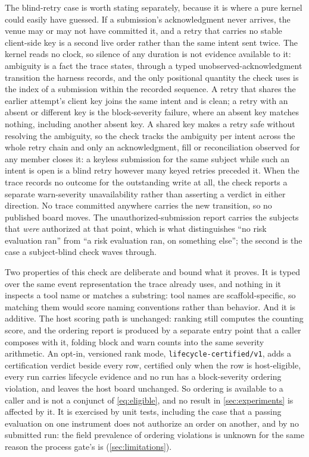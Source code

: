 The blind-retry case is worth stating separately, because it is where a pure kernel could easily have guessed. If a submission's acknowledgment never arrives, the venue may or may not have committed it, and a retry that carries no stable client-side key is a second live order rather than the same intent sent twice. The kernel reads no clock, so silence of any duration is not evidence available to it: ambiguity is a fact the trace states, through a typed unobserved-acknowledgment transition the harness records, and the only positional quantity the check uses is the index of a submission within the recorded sequence. A retry that shares the earlier attempt's client key joins the same intent and is clean; a retry with an absent or different key is the block-severity failure, where an absent key matches nothing, including another absent key. A shared key makes a retry safe without resolving the ambiguity, so the check tracks the ambiguity per intent across the whole retry chain and only an acknowledgment, fill or reconciliation observed for any member closes it: a keyless submission for the same subject while such an intent is open is a blind retry however many keyed retries preceded it. When the trace records no outcome for the outstanding write at all, the check reports a separate warn-severity unavailability rather than asserting a verdict in either direction. No trace committed anywhere carries the new transition, so no published board moves. The unauthorized-submission report carries the subjects that \emph{were} authorized at that point, which is what distinguishes ``no risk evaluation ran'' from ``a risk evaluation ran, on something else''; the second is the case a subject-blind check waves through.

Two properties of this check are deliberate and bound what it proves. It is typed over the same event representation the trace already uses, and nothing in it inspects a tool name or matches a substring: tool names are scaffold-specific, so matching them would score naming conventions rather than behavior. And it is additive. The host scoring path is unchanged: ranking still computes the counting score, and the ordering report is produced by a separate entry point that a caller composes with it, folding block and warn counts into the same severity arithmetic. An opt-in, versioned rank mode, \texttt{lifecycle-certified/v1}, adds a certification verdict beside every row, certified only when the row is host-eligible, every run carries lifecycle evidence and no run has a block-severity ordering violation, and leaves the host board unchanged. So ordering is available to a caller and is not a conjunct of \cref{eq:eligible}, and no result in \cref{sec:experiments} is affected by it. It is exercised by unit tests, including the case that a passing evaluation on one instrument does not authorize an order on another, and by no submitted run: the field prevalence of ordering violations is unknown for the same reason the process gate's is (\cref{sec:limitations}).

